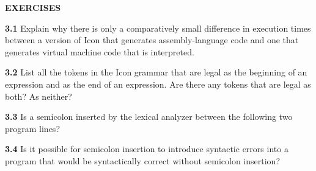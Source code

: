 \bigskip

\noindent\textbf{EXERCISES}

\textbf{3.1} Explain why there is only a comparatively small difference
in execution times between a version of Icon that generates
assembly-language code and one that generates virtual machine code
that is interpreted.

\textbf{3.2} List all the tokens in the Icon grammar that are legal as the
beginning of an expression and as the end of an expression. Are there
any tokens that are legal as both? As neither?

\textbf{3.3} Is a semicolon inserted by the lexical analyzer between the
following two program lines?


\textbf{3.4} Is it possible for semicolon insertion to introduce
syntactic errors into a program that would be syntactically correct
without semicolon insertion?

